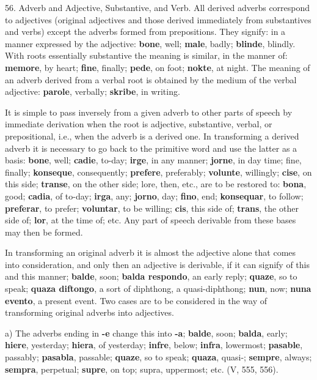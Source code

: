 56. Adverb and Adjective, Substantive, and Verb. All derived adverbs correspond to adjectives (original adjectives and those derived immediately from substantives and verbs) except the adverbs formed from prepositions. They signify: in a manner expressed by the adjective: \textbf{bone}, well; \textbf{male}, badly; \textbf{blinde}, blindly. With roots essentially substantive the meaning is similar, in the manner of: \textbf{memore}, by heart; \textbf{fine}, finally; \textbf{pede}, on foot; \textbf{nokte}, at night. The meaning of an adverb derived from a verbal root is obtained by the medium of the verbal adjective: \textbf{parole}, verbally; \textbf{skribe}, in writing. 

It is simple to pass inversely from a given adverb to other parts of speech by immediate derivation when the root is adjective, substantive, verbal, or prepositional, i.e., when the adverb is a derived one. In transforming a derived adverb it is necessary to go back to the primitive word and use the latter as a basis: \textbf{bone}, well; \textbf{cadie}, to-day; \textbf{irge}, in any manner; \textbf{jorne}, in day time; fine, finally; \textbf{konseque}, consequently; \textbf{prefere}, preferably; \textbf{volunte}, willingly; \textbf{cise}, on this side; \textbf{transe}, on the other side; lore, then, etc., are to be restored to: \textbf{bona}, good; \textbf{cadia}, of to-day; \textbf{irga}, any; \textbf{jorno}, day; \textbf{fino}, end; \textbf{konsequar}, to follow; \textbf{preferar}, to prefer; \textbf{voluntar}, to be willing; \textbf{cis}, this side of; \textbf{trans}, the other side of; \textbf{lor}, at the time of; etc. Any part of speech derivable from these bases may then be formed. 

In transforming an original adverb it is almost the adjective alone that comes into consideration, and only then an adjective is derivable, if it can signify of this and this manner; \textbf{balde}, soon; \textbf{balda respondo}, an early reply; \textbf{quaze}, so to speak; \textbf{quaza diftongo}, a sort of diphthong, a quasi-diphthong; \textbf{nun}, now; \textbf{nuna evento}, a present event. Two cases are to be considered in the way of transforming original adverbs into adjectives. 

a) The adverbs ending in \textbf{-e} change this into \textbf{-a}; \textbf{balde}, soon; \textbf{balda}, early; \textbf{hiere}, yesterday; \textbf{hiera}, of yesterday; \textbf{infre}, below; \textbf{infra}, lowermost; \textbf{pasable}, passably; \textbf{pasabla}, passable; \textbf{quaze}, so to speak; \textbf{quaza}, quasi-; \textbf{sempre}, always; \textbf{sempra}, perpetual; \textbf{supre}, on top; supra, uppermost; etc. (V, 555, 556). 

